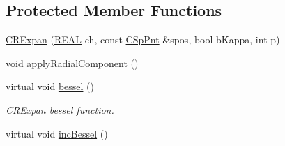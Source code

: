 \subsection*{Protected Member Functions}
\begin{DoxyCompactItemize}
\item 
\hyperlink{classCRExpan_ad0996a806c924de51cf24d5206491e4f}{C\-R\-Expan} (\hyperlink{util_8h_a5821460e95a0800cf9f24c38915cbbde}{R\-E\-A\-L} ch, const \hyperlink{classCSpPnt}{C\-Sp\-Pnt} \&spos, bool b\-Kappa, int p)
\item 
void \hyperlink{classCRExpan_a86bd4b126a24a02d6c12c7e97890dab0}{apply\-Radial\-Component} ()
\item 
virtual void \hyperlink{classCRExpan_af757855cd2921767096d749dc8a73c1a}{bessel} ()
\begin{DoxyCompactList}\small\item\em \hyperlink{classCRExpan}{C\-R\-Expan} bessel function. \end{DoxyCompactList}\item 
virtual void \hyperlink{classCRExpan_a84363b4b1da0da40753f1602c77b5401}{inc\-Bessel} ()
\end{DoxyCompactItemize}

